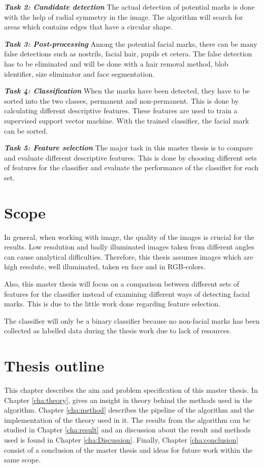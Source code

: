 \textbf{\textit{Task 2: Candidate detection}}
The actual detection of potential marks is done with the help of radial symmetry in the image. The algorithm will search for areas which contains edges that have a circular shape.   

\textbf{\textit{Task 3: Post-processing}}
Among the potential facial marks, there can be many false detections such as nostrils, facial hair, pupils et cetera. The false detection has to be eliminated and will be done with a hair removal method, blob identifier, size eliminator and face segmentation.

\textbf{\textit{Task 4: Classification}}
When the marks have been detected, they have to be sorted into the two classes, permanent and non-permanent. This is done by calculating different descriptive features. These features are used to train a supervised support vector machine. With the trained classifier, the facial mark can be sorted. 

\textbf{\textit{Task 5: Feature selection}}
The major task in this master thesis is to compare and evaluate different descriptive features. This is done by choosing different sets of features for the classifier and evaluate the performance of the classifier for each set. 

\section{Scope}

In general, when working with image, the quality of the images is crucial for the results. Low resolution and badly illuminated images taken from different angles can cause analytical difficulties. Therefore, this thesis assumes images which are high resolute, well illuminated, taken en face and in RGB-colors. 

Also, this master thesis will focus on a comparison between different sets of features for the classifier instead of examining different ways of detecting facial marks. This is due to the little work done regarding feature selection. 

The classifier will only be a binary classifier because no non-facial marks has been collected as labelled data during the thesis work due to lack of resources.   

\section{Thesis outline}

This chapter describes the aim and problem specification of this master thesis. In Chapter \ref{cha:theory}, gives an insight in theory behind the methods used in the algorithm. Chapter \ref{cha:method} describes the pipeline of the algorithm and the implementation of the theory used in it. The results from the algorithm can be studied in Chapter \ref{cha:result} and an discussion about the result and methods used is found in Chapter \ref{cha:Discussion}. Finally, Chapter \ref{cha:conclusion} consist of a conclusion of the master thesis and ideas for future work within the same scope. 